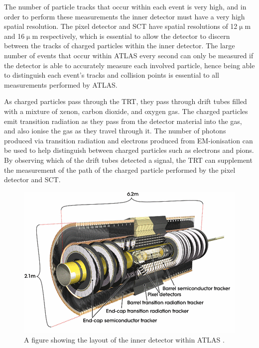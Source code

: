 \documentclass[12pt,a4paper,epsf,portrait,times,epsfig]{article}
\begin{document}
		The number of particle tracks that occur within each event is very high, and in order to perform these measurements the inner detector must have a very high spatial resolution. The pixel detector and SCT have spatial resolutions of 12$\upmu$m and 16$\upmu$m respectively, which is	essential to allow the detector to discern between the tracks of charged particles within the
		inner detector. The large number of events that occur within ATLAS every second can only be measured if the detector is able to accurately measure each involved particle, hence being	able to distinguish each event’s tracks and collision points is essential to all measurements
		performed by ATLAS. \par
		
		As charged particles pass through the TRT, they pass through drift tubes filled with a mixture of xenon, carbon dioxide, and oxygen gas. The charged particles emit transition radiation as they pass from the detector material into the gas, and also ionise the gas as they travel through it. The number of photons produced via transition radiation and
		electrons produced from EM-ionisation can be used to help distinguish between charged	particles such as electrons and pions. By observing which of the drift tubes detected a	signal, the TRT can supplement the measurement of the path of the charged particle	performed by the pixel detector and SCT. \par
		
		
		\begin{figure}
			\centering
			\includegraphics[scale=0.7]{Inner_Detector}
			\caption{A figure showing the layout of the inner detector within ATLAS \cite{Article:ATLASDesignPaper}. }
			\label{Fig:InnerDetector}
		\end{figure}

\end{document}

